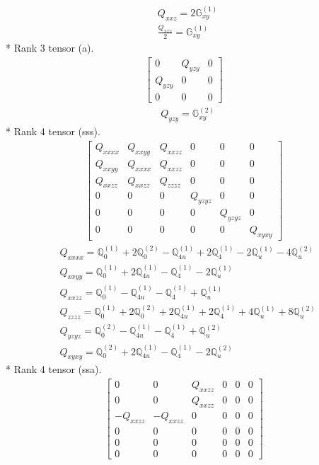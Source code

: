 \documentclass[fleqn,8pt,landscape]{jsarticle}
\begin{document}
\begin{align*}
& Q_{xxz} = 2 \mathbb{G}_{xy}^{(1)} \\
& \frac{Q_{xxz}}{2} = \mathbb{G}_{xy}^{(1)}
\end{align*}
* Rank 3 tensor (a).
\begin{align*}
\begin{bmatrix} 0 & Q_{yzy} & 0 \\ Q_{yzy} & 0 & 0 \\ 0 & 0 & 0 \end{bmatrix}
\end{align*}
\begin{align*}
& Q_{yzy} = \mathbb{G}_{xy}^{(2)}
\end{align*}
* Rank 4 tensor (sss).
\begin{align*}
\begin{bmatrix} Q_{xxxx} & Q_{xxyy} & Q_{xxzz} & 0 & 0 & 0 \\ Q_{xxyy} & Q_{xxxx} & Q_{xxzz} & 0 & 0 & 0 \\ Q_{xxzz} & Q_{xxzz} & Q_{zzzz} & 0 & 0 & 0 \\ 0 & 0 & 0 & Q_{yzyz} & 0 & 0 \\ 0 & 0 & 0 & 0 & Q_{yzyz} & 0 \\ 0 & 0 & 0 & 0 & 0 & Q_{xyxy} \end{bmatrix}
\end{align*}
\begin{align*}
& Q_{xxxx} = \mathbb{Q}_{0}^{(1)} + 2 \mathbb{Q}_{0}^{(2)} - \mathbb{Q}_{4u}^{(1)} + 2 \mathbb{Q}_{4}^{(1)} - 2 \mathbb{Q}_{u}^{(1)} - 4 \mathbb{Q}_{u}^{(2)} \\
& Q_{xxyy} = \mathbb{Q}_{0}^{(1)} + 2 \mathbb{Q}_{4u}^{(1)} - \mathbb{Q}_{4}^{(1)} - 2 \mathbb{Q}_{u}^{(1)} \\
& Q_{xxzz} = \mathbb{Q}_{0}^{(1)} - \mathbb{Q}_{4u}^{(1)} - \mathbb{Q}_{4}^{(1)} + \mathbb{Q}_{u}^{(1)} \\
& Q_{zzzz} = \mathbb{Q}_{0}^{(1)} + 2 \mathbb{Q}_{0}^{(2)} + 2 \mathbb{Q}_{4u}^{(1)} + 2 \mathbb{Q}_{4}^{(1)} + 4 \mathbb{Q}_{u}^{(1)} + 8 \mathbb{Q}_{u}^{(2)} \\
& Q_{yzyz} = \mathbb{Q}_{0}^{(2)} - \mathbb{Q}_{4u}^{(1)} - \mathbb{Q}_{4}^{(1)} + \mathbb{Q}_{u}^{(2)} \\
& Q_{xyxy} = \mathbb{Q}_{0}^{(2)} + 2 \mathbb{Q}_{4u}^{(1)} - \mathbb{Q}_{4}^{(1)} - 2 \mathbb{Q}_{u}^{(2)}
\end{align*}
* Rank 4 tensor (ssa).
\begin{align*}
\begin{bmatrix} 0 & 0 & Q_{xxzz} & 0 & 0 & 0 \\ 0 & 0 & Q_{xxzz} & 0 & 0 & 0 \\ - Q_{xxzz} & - Q_{xxzz} & 0 & 0 & 0 & 0 \\ 0 & 0 & 0 & 0 & 0 & 0 \\ 0 & 0 & 0 & 0 & 0 & 0 \\ 0 & 0 & 0 & 0 & 0 & 0 \end{bmatrix}
\end{align*}
\end{document}
